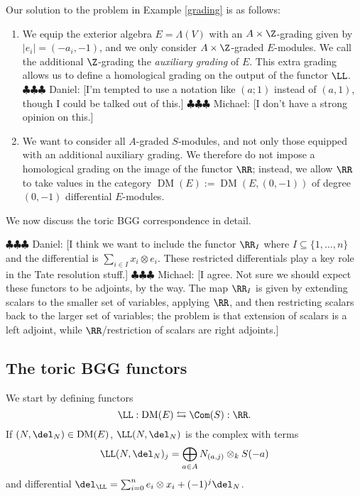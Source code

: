 \documentclass[12pt]{amsart}
\theoremstyle{definition}
\theoremstyle{remark}
\newcommand{\ZZ}{\mathbb Z}
\newcommand{\daniel}[1]{{\color{blue} \sf $\clubsuit\clubsuit\clubsuit$ Daniel: [#1]}}
\newcommand{\michael}[1]{{\color{red} \sf $\clubsuit\clubsuit\clubsuit$ Michael: [#1]}}
\def\DM{\operatorname{DM}}
\begin{document}
Our solution to the problem in Example \ref{grading} is as follows:
\begin{enumerate}
\item We equip the exterior algebra $E = \Lambda(V)$ with an $A \times \Z$-grading given by $|e_i| = (-a_i, -1)$, and we only consider $A \times \Z$-graded $E$-modules. We call the additional $\Z$-grading the \emph{auxiliary grading} of $E$. This extra grading allows us to define a homological grading on the output of the functor $\LL$. \daniel{I'm tempted to use a notation like $(a;1)$ instead of $(a,1)$, though I could be talked out of this.} \michael{I don't have a strong opinion on this.}
\item We want to consider all $A$-graded $S$-modules, and not only those equipped with an additional auxiliary grading. We therefore do not impose a homological grading on the image of the functor $\RR$; instead, we allow $\RR$ to take values in the category $\DM(E) := \DM(E , (0, -1))$ of degree $(0, -1)$ differential $E$-modules.
\end{enumerate}

We now discuss the toric BGG correspondence in detail.


\daniel{I think we want to include the functor $\RR_I$ where $I\subseteq \{1, \dots, n\}$ and the differential is $\sum_{i\in I} x_i\otimes e_i$.  These restricted differentials play a key role in the Tate resolution stuff.} \michael{I agree. Not sure we should expect these functors to be adjoints, by the way. The map $\RR_I$ is given by extending scalars to the smaller set of variables, applying $\RR$, and then restricting scalars back to the larger set of variables; the problem is that extension of scalars is a left adjoint, while $\RR$/restriction of scalars are right adjoints.}
\subsection{The toric BGG functors}
\iffalse
In the BGG correspondence for the standard $\ZZ$-graded polynomial ring, there are adjoint functors $\RR$ and $\LL$, which give equivalences of categories between $D(S)$ and $D(E)$.  

Famously, under the functor $\RR$,  the standard $\ZZ$-grading of the $S$-modules becomes the homological grading on $D(E)$ side, and the homological grading on $D(S)$ becomes the $\ZZ$-grading of the $E$-modules.  (A similar statement holds for $\LL$.)

Things are more subtle if $S$ has a nonstandard grading, though a similar exchange still holds.  In this section, we will define adjoint functors $\RR$ and $\LL$ which give equivalences of categories between the derived category of $S$-modules and the derived category of differen \daniel{got interrupted while editing\dots}
\fi
We start by defining functors
$$
\LL : \DM(E) \leftrightarrows \Com(S) : \RR.
$$
If $(N, \del_N) \in \DM(E)$, $\LL(N, \del_N)$ is the complex with terms
$$
\LL(N, \del_N)_j = \bigoplus_{a \in A} N_{(a, j)} \otimes_k S(-a)
$$
and differential $\del_{\LL} = \sum_{i = 0}^n e_i \otimes x_i + (-1)^j \del_N$. 
\end{document}
